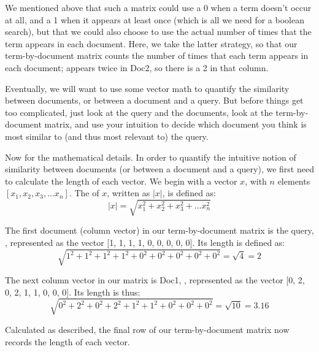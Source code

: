   We mentioned above that such a matrix could use a 0 when a term doesn't occur at all, and a 1 when it appears at least once (which is all we need for a boolean search), but that we could also choose to use the actual number of times that the term appears in each document.  Here, we take the latter strategy, so that our term-by-document matrix counts the number of times that each term appears in each document;  appears twice in Doc2, so there is a 2 in that column.

Eventually, we will want to use some vector math to quantify the similarity between documents, or between a document and a query.  But before things get too complicated, just look at the query and the documents, look at the term-by-document matrix, and use your intuition to decide which document you think is most similar to (and thus most relevant to) the query.

Now for the mathematical details.  In order to quantify the intuitive notion of similarity between documents (or between a document and a query), we first need to calculate the length of each vector.  We begin with a vector $x$, with $n$ elements $[x_{1}, x_{2}, x_{3}, \ldots x_{n}]$.  The  of $x$, written as $|x|$, is defined as:
\begin{equation}
 |x| = \sqrt{x_{1}^{2} + x_{2}^{2} +  x_{3}^{2} + \ldots x_{n}^{2}}
\end{equation}

The first document (column vector) in our term-by-document matrix is the query, , represented as the vector [1, 1, 1, 1, 0, 0, 0, 0, 0].  Its length is defined as:
\begin{equation}
  \sqrt{1^{2} + 1^{2} + 1^{2} + 1^{2} + 0^{2} + 0^{2} + 0^{2} + 0^{2} + 0^{2}} = \sqrt{4} = 2
\end{equation}

The next column vector in our matrix is Doc1, , represented as the vector [0, 2, 0, 2, 1, 1, 0, 0, 0].  Its length is thus:
\begin{equation}
   \sqrt{0^{2} + 2^{2} + 0^{2} + 2^{2} + 1^{2} + 1^{2} + 0^{2} + 0^{2} + 0^{2}} = \sqrt{10} = 3.16 
\end{equation}

Calculated as described, the final row of our term-by-document matrix now records the length of each vector.


